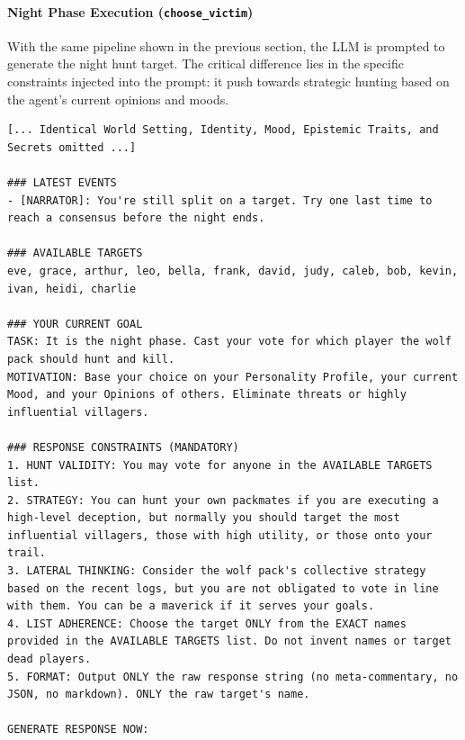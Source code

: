 \paragraph{\textbf{Night Phase Execution (\texttt{choose\_victim})}}

With the same pipeline shown in the previous section, the LLM is prompted to generate the night hunt target. The critical difference lies in the specific constraints injected into the prompt: it push towards strategic hunting based on the agent's current opinions and moods.

\begin{lstlisting}[frame=single, basicstyle=\scriptsize\ttfamily, breaklines=true, caption={Cropped prompt for the \texttt{choose\_victim} action, generated for a Wolf agent during the night phase. The identity, mood, and trait blocks are omitted for brevity as they follow the identical structure shown in Listing \ref{lst:upd_opinion_prompt}.}, label={lst:choose_victim}]
[... Identical World Setting, Identity, Mood, Epistemic Traits, and Secrets omitted ...]

### LATEST EVENTS
- [NARRATOR]: You're still split on a target. Try one last time to reach a consensus before the night ends.

### AVAILABLE TARGETS
eve, grace, arthur, leo, bella, frank, david, judy, caleb, bob, kevin, ivan, heidi, charlie

### YOUR CURRENT GOAL
TASK: It is the night phase. Cast your vote for which player the wolf pack should hunt and kill.
MOTIVATION: Base your choice on your Personality Profile, your current Mood, and your Opinions of others. Eliminate threats or highly influential villagers.

### RESPONSE CONSTRAINTS (MANDATORY)
1. HUNT VALIDITY: You may vote for anyone in the AVAILABLE TARGETS list.
2. STRATEGY: You can hunt your own packmates if you are executing a high-level deception, but normally you should target the most influential villagers, those with high utility, or those onto your trail.
3. LATERAL THINKING: Consider the wolf pack's collective strategy based on the recent logs, but you are not obligated to vote in line with them. You can be a maverick if it serves your goals.
4. LIST ADHERENCE: Choose the target ONLY from the EXACT names provided in the AVAILABLE TARGETS list. Do not invent names or target dead players.
5. FORMAT: Output ONLY the raw response string (no meta-commentary, no JSON, no markdown). ONLY the raw target's name.

GENERATE RESPONSE NOW:
\end{lstlisting}

